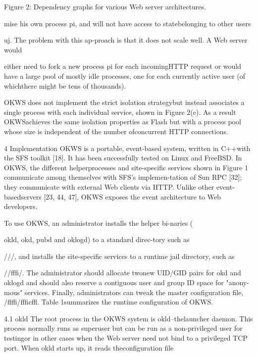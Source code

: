 Figure 2: Dependency graphs for various Web server architectures.

mise his own process pi, and will not have access to statebelonging to other users

uj. The problem with this ap-proach is that it does not scale well. A Web server would

either need to fork a new process pi for each incomingHTTP request or would have a large pool of mostly idle
processes, one for each currently active user (of whichthere might be tens of thousands).

OKWS does not implement the strict isolation strategybut instead associates a single process with each individual service, shown in Figure 2(e). As a result OKWSachieves the same isolation properties as Flash but with a
process pool whose size is independent of the number ofconcurrent HTTP connections.

4 Implementation
OKWS is a portable, event-based system, written in C++with the SFS toolkit [18]. It has been successfully tested
on Linux and FreeBSD. In OKWS, the different helperprocesses and site-specific services shown in Figure 1
communicate among themselves with SFS's implemen-tation of Sun RPC [32]; they communicate with external Web clients via HTTP. Unlike other event-basedservers [23, 44, 47], OKWS exposes the event architecture to Web developers.

To use OKWS, an administrator installs the helper bi-naries (

okld, okd, pubd and oklogd) to a standard direc-tory such as

/\Gamma \Delta \Theta /\Lambda \Xi \Pi \Sigma \Lambda /\Delta \Upsilon \Phi \Psi , and installs the site-specific services to a runtime jail directory, such as

/\Omega \Sigma \Theta /\Xi fffi\Delta /\Theta \Gamma \Psi . The administrator should allocate twonew UID/GID pairs for okd and oklogd and should also
reserve a contiguous user and group ID space for "anony-mous" services. Finally, administrators can tweak the
master configuration file, /flffi\Pi /\Xi fffi\Delta  \Pi \Xi \Psi c\Phi ffl. Table 1summarizes the runtime configuration of OKWS.

4.1 okld
The root process in the OKWS system is okld--thelauncher daemon. This process normally runs as superuser but can be run as a non-privileged user for testingor in other cases when the Web server need not bind to
a privileged TCP port. When okld starts up, it reads theconfiguration file

